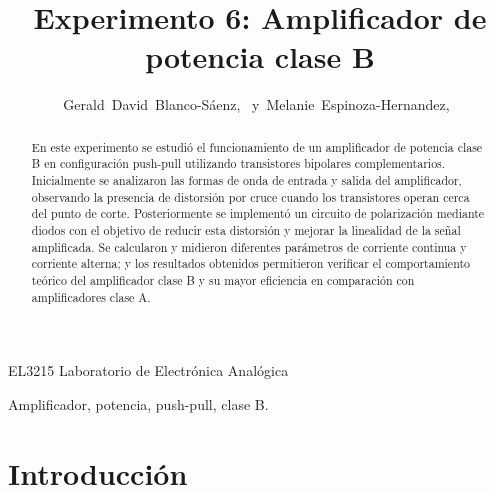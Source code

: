 \documentclass[journal]{IEEEtran}
\begin{document}
%
\title{Experimento 6: Amplificador de potencia clase B}


\author{Gerald~David~Blanco-Sáenz,~
        y~Melanie~Espinoza-Hernandez,~}


%
{EL3215 Laboratorio de Electrónica Analógica}


\maketitle


\begin{abstract}
En este experimento se estudió el funcionamiento de un amplificador de potencia clase B en configuración push-pull utilizando transistores bipolares complementarios. Inicialmente se analizaron las formas de onda de entrada y salida del amplificador, observando la presencia de distorsión por cruce cuando los transistores operan cerca del punto de corte. Posteriormente se implementó un circuito de polarización mediante diodos con el objetivo de reducir esta distorsión y mejorar la linealidad de la señal amplificada. Se calcularon y midieron diferentes parámetros de corriente continua y corriente alterna; y los resultados obtenidos permitieron verificar el comportamiento teórico del amplificador clase B y su mayor eficiencia en comparación con amplificadores clase A.
\end{abstract}

\begin{IEEEkeywords}
Amplificador, potencia, push-pull, clase B.
\end{IEEEkeywords}


\section{Introducción}
\end{document}
